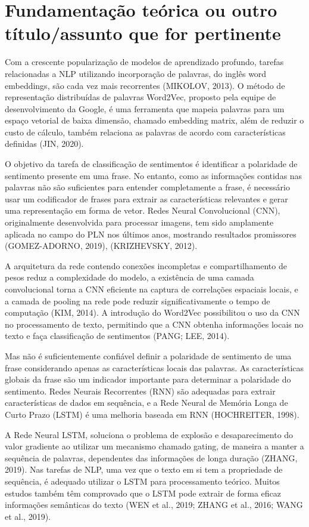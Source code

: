 \chapter{Fundamentação teórica ou outro título/assunto que for pertinente}

Com a crescente popularização de modelos de aprendizado profundo, tarefas relacionadas a NLP utilizando incorporação de palavras, do inglês word embeddings, são cada vez mais recorrentes (MIKOLOV, 2013). O método de representação distribuídas de palavras Word2Vec, proposto pela equipe de desenvolvimento da Google, é uma ferramenta que mapeia palavras para um espaço vetorial de baixa dimensão, chamado embedding matrix, além de reduzir o custo de cálculo, também relaciona as palavras de acordo com características definidas (JIN, 2020).

O objetivo da tarefa de classificação de sentimentos é identificar a polaridade de sentimento presente em uma frase. No entanto, como as informações contidas nas palavras não são suficientes para entender completamente a frase, é necessário usar um codificador de frases para extrair as características relevantes e gerar uma representação em forma de vetor. Redes Neural Convolucional (CNN), originalmente desenvolvida para processar imagens, tem sido amplamente aplicada no campo do PLN nos últimos anos, mostrando resultados promissores (GOMEZ-ADORNO, 2019), (KRIZHEVSKY, 2012).

A arquitetura da rede contendo conexões incompletas e compartilhamento de pesos reduz a complexidade do modelo, a existência de uma camada convolucional torna a CNN eficiente na captura de correlações espaciais locais, e a camada de pooling na rede pode reduzir significativamente o tempo de computação (KIM, 2014). A introdução do Word2Vec possibilitou o uso da CNN no processamento de texto, permitindo que a CNN obtenha informações locais no texto e faça classificação de sentimentos (PANG; LEE, 2014).

Mas não é suficientemente confiável definir a polaridade de sentimento de uma frase considerando apenas as características locais das palavras. As características globais da frase são um indicador importante para determinar a polaridade do sentimento. Redes Neurais Recorrentes (RNN) são adequadas para extrair características de dados em sequência, e a Rede Neural de Memória Longa de Curto Prazo (LSTM) é uma melhoria baseada em RNN (HOCHREITER, 1998).

A Rede Neural LSTM, soluciona o problema de explosão e desaparecimento do valor gradiente ao utilizar um mecanismo chamado gating, de maneira a manter a sequência de palavras, dependentes das informações de longa duração (ZHANG, 2019). Nas tarefas de NLP, uma vez que o texto em si tem a propriedade de sequência, é adequado utilizar o LSTM para processamento teórico. Muitos estudos também têm comprovado que o LSTM pode extrair de forma eficaz informações semânticas do texto (WEN et al., 2019; ZHANG et al., 2016; WANG et al., 2019).

